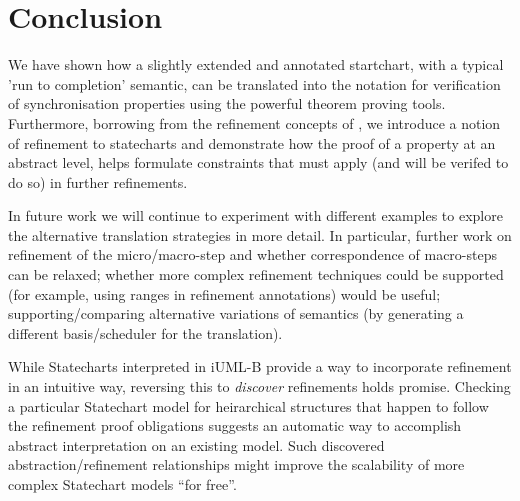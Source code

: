 
\section{Conclusion}
\label{sec:conclusion}
We have shown how a slightly extended and annotated startchart, with a typical 'run to completion' semantic, can be translated into the \EventB notation for verification of synchronisation properties using the powerful \EventB theorem proving tools.
Furthermore, borrowing from the refinement concepts of \EventB, we introduce a notion of refinement to statecharts and demonstrate how the proof of a property at an abstract level, helps formulate constraints that must apply (and will be verifed to do so) in further refinements.

In future work we will continue to experiment with different examples to explore the alternative translation strategies in more detail. 
In particular, further work on refinement of the micro/macro-step and whether correspondence of macro-steps can be relaxed; whether more complex refinement techniques could be supported (for example, using ranges in refinement annotations) would be useful; supporting/comparing alternative variations of semantics (by generating a different basis/scheduler for the translation).


While Statecharts interpreted in iUML-B provide a way to incorporate refinement in an intuitive way, reversing this to \emph{discover} refinements holds promise. 
Checking a particular Statechart model for heirarchical structures that happen to follow the refinement proof obligations suggests an automatic way to accomplish abstract interpretation on an existing model.  
Such discovered abstraction/refinement relationships might improve the scalability of more complex Statechart models ``for free''.

